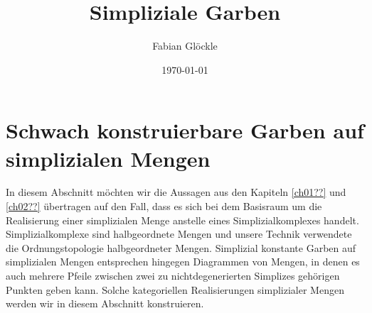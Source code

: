 



\title{Simpliziale Garben}
\author{Fabian Glöckle}
\date{\today}

\section{Schwach konstruierbare Garben auf simplizialen Mengen}

In diesem Abschnitt möchten wir die Aussagen aus den Kapiteln
\ref{ch01??} und \ref{ch02??}  übertragen auf den Fall, dass es sich
bei dem Basisraum um die Realisierung einer simplizialen Menge
anstelle eines Simplizialkomplexes handelt. Simplizialkomplexe sind
halbgeordnete Mengen und unsere Technik verwendete die
Ordnungstopologie halbgeordneter Mengen. Simplizial konstante Garben
auf simplizialen Mengen entsprechen hingegen Diagrammen von Mengen, in
denen es auch mehrere Pfeile zwischen zwei zu nichtdegenerierten
Simplizes gehörigen Punkten geben kann. Solche kategoriellen
Realisierungen simplizialer Mengen werden wir in diesem Abschnitt
konstruieren.

